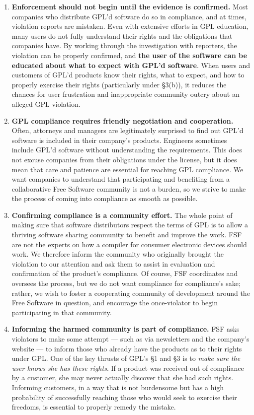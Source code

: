 \documentclass[12pt]{report}
\begin{document}
\begin{enumerate}

\item {\bf Enforcement should not begin until the evidence is confirmed.}
  Most companies who distribute GPL'd software do so in compliance, and at
  times, violation reports are mistaken.  Even with extensive efforts in
  GPL education, many users do not fully understand their rights and the
  obligations that companies have.  By working through the investigation
  with reporters, the violation can be properly confirmed, and {\bf the
    user of the software can be educated about what to expect with GPL'd
    software}.  When users and customers of GPL'd products know their
  rights, what to expect, and how to properly exercise their rights
  (particularly under \S 3(b)), it reduces the chances for user
  frustration and inappropriate community outcry about an alleged GPL
  violation.

\item {\bf GPL compliance requires friendly negotiation and cooperation.}
  Often, attorneys and managers are legitimately surprised to find out
  GPL'd software is included in their company's products.  Engineers
  sometimes include GPL'd software without understanding the requirements.
  This does not excuse companies from their obligations under the license,
  but it does mean that care and patience are essential for reaching GPL
  compliance.  We want companies to understand that participating and
  benefiting from a collaborative Free Software community is not a burden,
  so we strive to make the process of coming into compliance as smooth as
  possible.

\item {\bf Confirming compliance is a community effort.}  The whole point
  of making sure that software distributors respect the terms of GPL is to
  allow a thriving software sharing community to benefit and improve the
  work.  FSF are not the experts on how a compiler for consumer electronic
  devices should work.  We therefore inform the community who originally
  brought the violation to our attention and ask them to assist in
  evaluation and confirmation of the product's compliance.  Of course, FSF
  coordinates and oversees the process, but we do not want compliance for
  compliance's sake; rather, we wish to foster a cooperating community of
  development around the Free Software in question, and encourage the
  once-violator to begin participating in that community.

\item {\bf Informing the harmed community is part of compliance.} FSF asks
  violators to make some attempt --- such as via newsletters and the
  company's website --- to inform those who already have the products as
  to their rights under GPL\@.  One of the key thrusts of GPL's \S 1 and
  \S 3 is to {\em make sure the user knows she has these rights\/}.  If a
  product was received out of compliance by a customer, she may never
  actually discover that she had such rights.  Informing customers, in a
  way that is not burdensome but has a high probability of successfully
  reaching those who would seek to exercise their freedoms, is essential
  to properly remedy the mistake.


\end{enumerate}
\end{document}
